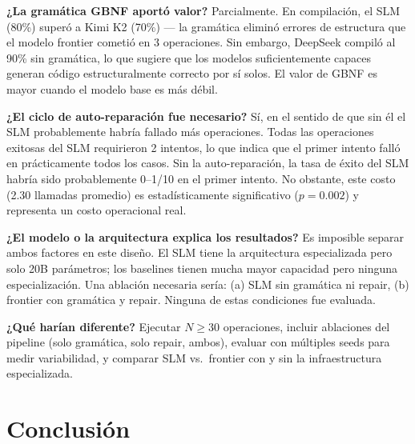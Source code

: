 \documentclass[12pt]{article}
\begin{document}
\textbf{¿La gramática GBNF aportó valor?} Parcialmente. En compilación, el SLM
(80\%) superó a Kimi K2 (70\%) — la gramática eliminó errores de estructura que el
modelo frontier cometió en 3 operaciones. Sin embargo, DeepSeek compiló al 90\% sin
gramática, lo que sugiere que los modelos suficientemente capaces generan código
estructuralmente correcto por sí solos. El valor de GBNF es mayor cuando el modelo
base es más débil.

\textbf{¿El ciclo de auto-reparación fue necesario?} Sí, en el sentido de que sin
él el SLM probablemente habría fallado más operaciones. Todas las operaciones exitosas
del SLM requirieron 2 intentos, lo que indica que el primer intento falló en
prácticamente todos los casos. Sin la auto-reparación, la tasa de éxito del SLM
habría sido probablemente 0--1/10 en el primer intento. No obstante, este costo
(2.30 llamadas promedio) es estadísticamente significativo ($p=0.002$) y representa
un costo operacional real.

\textbf{¿El modelo o la arquitectura explica los resultados?} Es imposible separar
ambos factores en este diseño. El SLM tiene la arquitectura especializada pero solo
20B parámetros; los baselines tienen mucha mayor capacidad pero ninguna especialización.
Una ablación necesaria sería: (a) SLM sin gramática ni repair, (b) frontier con
gramática y repair. Ninguna de estas condiciones fue evaluada.

\textbf{¿Qué harían diferente?} Ejecutar $N \geq 30$ operaciones, incluir ablaciones
del pipeline (solo gramática, solo repair, ambos), evaluar con múltiples seeds para
medir variabilidad, y comparar SLM vs.\ frontier con y sin la infraestructura
especializada.

\section{Conclusión}
\end{document}
